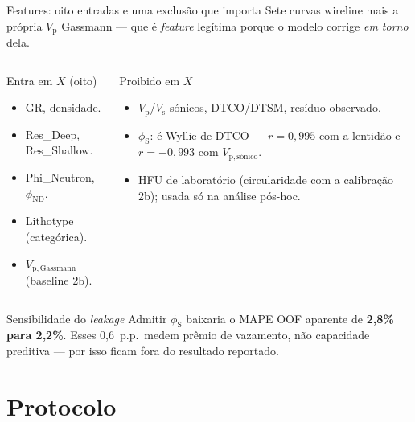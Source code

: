 \documentclass[aspectratio=169,10pt]{beamer}
\newcommand{\phiND}{\ensuremath{\phi_{\mathrm{ND}}}}
\newcommand{\phiS}{\ensuremath{\phi_{\mathrm{S}}}}
\newcommand{\Vp}{\ensuremath{V_{\mathrm{p}}}}
\newcommand{\Vs}{\ensuremath{V_{\mathrm{s}}}}
\newcommand{\Vpsonsub}{\ensuremath{V_{\mathrm{p,}\text{sónico}}}}
\begin{document}
\begin{frame}{Features: oito entradas e uma exclusão que importa}
  \footnotesize
  Sete curvas wireline mais a própria \Vp{} Gassmann --- que é \emph{feature}
  legítima porque o modelo corrige \emph{em torno} dela.
  \vspace{0.06cm}
  \begin{columns}[T,onlytextwidth]
    \begin{block}{Entra em $X$ (oito)}
      \scriptsize
      \begin{itemize}
        \item GR, densidade.
        \item Res\_Deep, Res\_Shallow.
        \item Phi\_Neutron, \phiND{}.
        \item Lithotype (categórica).
        \item $V_{\mathrm{p,Gassmann}}$ (baseline 2b).
      \end{itemize}
    \end{block}
    \begin{exampleblock}{Proibido em $X$}
      \scriptsize
      \begin{itemize}
        \item \Vp{}/\Vs{} sónicos, DTCO/DTSM, resíduo observado.
        \item \textbf{\phiS{}}: é Wyllie de DTCO ---
              $r = 0{,}995$ com a lentidão e $r = -0{,}993$ com
              \Vpsonsub{}.
        \item HFU de laboratório (circularidade com a calibração 2b);
              usada só na análise pós-hoc.
      \end{itemize}
    \end{exampleblock}
  \end{columns}
  \vspace{0.08cm}
  \begin{block}{Sensibilidade do \emph{leakage}}
    \scriptsize
    Admitir \phiS{} baixaria o MAPE OOF aparente de \textbf{2,8\% para 2,2\%}.
    Esses 0,6~p.p.\ medem prêmio de vazamento, não capacidade preditiva ---
    por isso ficam fora do resultado reportado.
  \end{block}
\end{frame}

\section{Protocolo}
\end{document}
